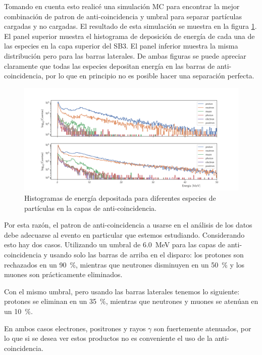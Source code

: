 Tomando en cuenta esto realicé una simulación MC para encontrar la mejor combinación de patron de anti-coincidencia y umbral para separar partículas cargadas y no cargadas. El resultado de esta simulación se muestra en la figura \ref{fig:anti-patterns}. El panel superior muestra el histograma de deposición de energía de cada una de las especies en la capa superior del SB3. El panel inferior muestra la misma distribución pero para las barras laterales. De ambas figuras se puede apreciar claramente que todas las especies depositan energía en las barras de anti-coincidencia, por lo que en principio no es posible hacer una separación perfecta.

\begin{figure}
        \centering
        \includegraphics[width=\textwidth]{anti-pattern.pdf}
        \caption{Histogramas de energía depositada para diferentes especies de partículas en la capas de anti-coincidencia.}
        \label{fig:anti-patterns}
\end{figure}

Por esta razón, el patron de anti-coincidencia a usarse en el análisis de los datos debe adecuarse al evento en particular que estemos estudiando. Considerando esto hay dos casos. Utilizando un umbral de \SI{6.0}{\mega\electronvolt} para las capas de anti-coincidencia y usando solo las barras de arriba en el disparo: los protones son rechazados en un \SI{90}{\percent}, mientras que neutrones disminuyen en un \SI{50}{\percent} y los muones son prácticamente eliminados.

Con el mismo umbral, pero usando las barras laterales tenemos lo siguiente: protones se eliminan en un \SI{35}{\percent}, mientras que neutrones y muones se atenúan en un \SI{10}{\percent}.

En ambos casos electrones, positrones y rayos $\gamma$ son fuertemente atenuados, por lo que si se desea ver estos productos no es conveniente el uso de la anti-coincidencia.
